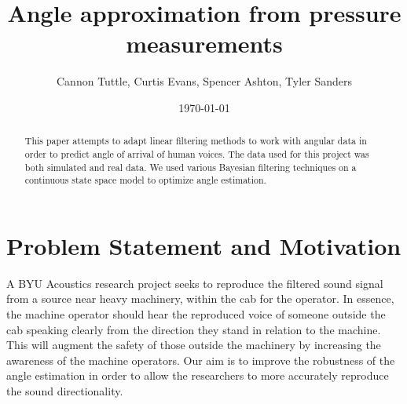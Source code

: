 \documentclass[11pt]{amsart}
\begin{document}
\title{Angle approximation from pressure measurements}
\author{Cannon Tuttle, Curtis Evans, Spencer Ashton, Tyler Sanders}

\date{\today}

\begin{abstract}
    This paper attempts to adapt linear filtering methods to work with angular data in order to predict angle of arrival of human voices. The data used for this project was both simulated and real data. We used various Bayesian filtering techniques on a continuous state space model to optimize angle estimation.
\end{abstract}

\maketitle

\section{Problem Statement and Motivation}
A BYU Acoustics research project seeks to reproduce the filtered sound signal from a source near heavy machinery, within the cab for the operator. In essence, 
the machine operator should hear the reproduced voice of someone outside the cab speaking clearly from the direction they stand in relation to the machine. This 
will augment the safety of those outside the machinery by increasing the awareness of the machine operators. Our aim is to improve the robustness of the angle 
estimation in order to allow the researchers to more accurately reproduce the sound directionality.
\end{document}
